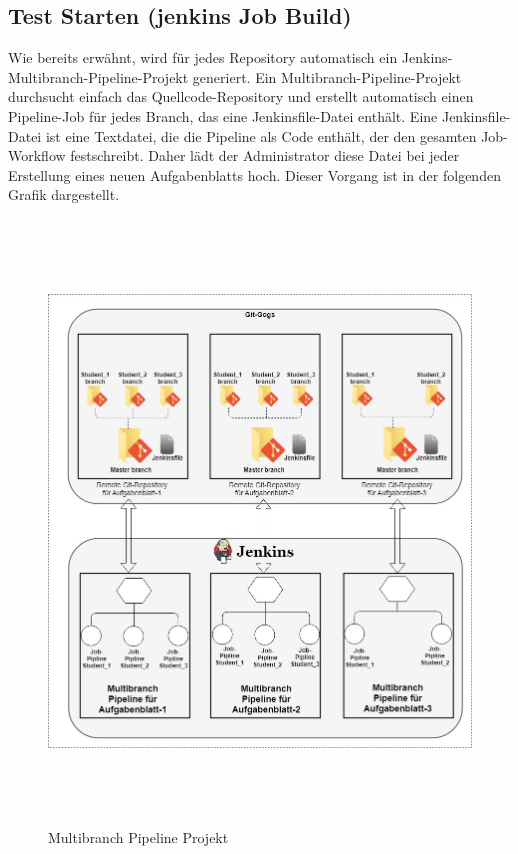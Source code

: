 \documentclass[a4paper,12pt,oneside]{book}
\begin{document}
\subsection{Test Starten (jenkins Job Build)}
Wie bereits erwähnt, wird für jedes Repository automatisch ein Jenkins-Multibranch-Pipeline-Projekt generiert. Ein Multibranch-Pipeline-Projekt durchsucht einfach das Quellcode-Repository und erstellt automatisch einen Pipeline-Job für jedes Branch, das eine Jenkinsfile-Datei enthält. 
\newline
Eine Jenkinsfile-Datei ist eine Textdatei, die die Pipeline als Code enthält, der den gesamten Job-Workflow festschreibt. Daher lädt der Administrator diese Datei bei jeder Erstellung eines neuen Aufgabenblatts hoch. Dieser Vorgang ist in der folgenden Grafik dargestellt.
\begin{figure}[h!]
	\begin{center}
		\includegraphics[width=13cm, height=16cm]{GogsJenkins.jpg}
		\caption{Multibranch Pipeline Projekt} 
		\label{ Multibranch Pipeline Projek } 
	\end{center}
\end{figure}
\end{document}
